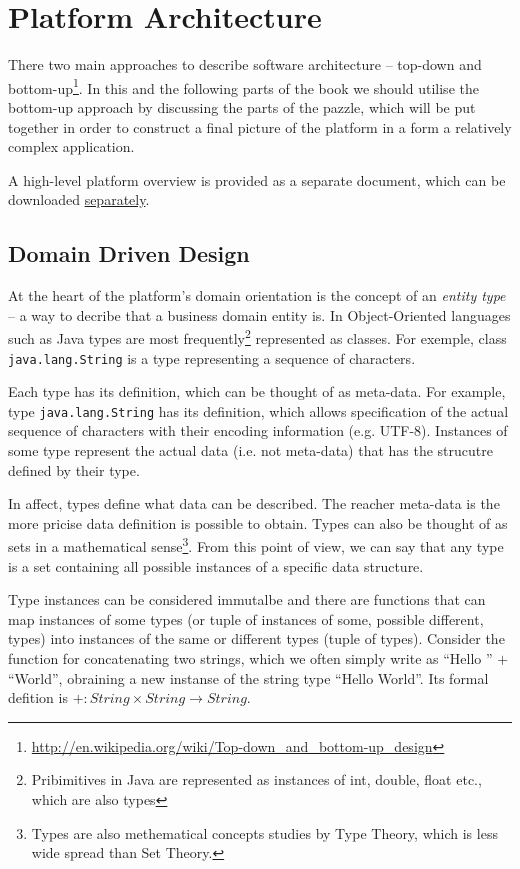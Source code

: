 \chapter{Platform Architecture}\label{ch01:01}

  There two main approaches to describe software architecture -- top-down and bottom-up\footnote{\url{http://en.wikipedia.org/wiki/Top-down_and_bottom-up_design}}.
  In this and the following parts of the book we should utilise the bottom-up approach by discussing the parts of the pazzle, which will be put together in order to construct a final picture of the platform in a form a relatively complex application.

  A high-level platform overview is provided as a separate document, which can be downloaded \href{http://www.fielden.com.ua/trac/pnl-tg/attachment/wiki/WikiStart/architecture-overview.pdf}{separately}.

\section{Domain Driven Design}

  At the heart of the platform's domain orientation is the concept of an \emph{entity type} -- a way to decribe that a business domain entity is.
  In Object-Oriented languages such as Java types are most frequently\footnote{Pribimitives in Java are represented as instances of int, double, float etc., which are also types} represented as classes.
  For exemple, class \texttt{java.lang.String} is a type representing a sequence of characters.
  
  Each type has its definition, which can be thought of as meta-data.
  For example, type \texttt{java.lang.String} has its definition, which allows specification of the actual sequence of characters with their encoding information (e.g. UTF-8).
  Instances of some type represent the actual data (i.e. not meta-data) that has the strucutre defined by their type.
  
  In affect, types define what data can be described.
  The reacher meta-data is the more pricise data definition is possible to obtain.
  Types can also be thought of as sets in a mathematical sense\footnote{Types are also methematical concepts studies by Type Theory, which is less wide spread than Set Theory.}.
  From this point of view, we can say that any type is a set containing all possible instances of a specific data structure.

  Type instances can be considered immutalbe and there are functions that can map instances of some types (or tuple of instances of some, possible different, types) into instances of the same or different types (tuple of types).
  Consider the function for concatenating two strings, which we often simply write as ``Hello '' $+$ ``World'', obraining a new instanse of the string type ``Hello World''.
  Its formal defition is $+:String\times String \rightarrow String$.

